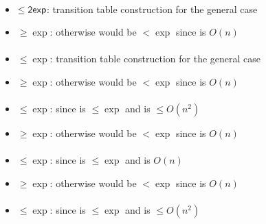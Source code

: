 \paragraph{\OLA{}\tto\ODFA}
\begin{itemize}
	\item $\le\mathsf{2exp}$: transition table construction for the general case \cite{PigPis14}
	\item $\ge\exp$: otherwise \hyperref[cost:1DLAto1DFAu]{\ODLA{}\tto\ODFA} would be $<\exp$ since \ODLA{}\tto\OLA is $O(n)$
\end{itemize}
\paragraph{\OLA{}\tto\ONFA}\label{cost:1DLAto1NFAu}
\begin{itemize}
	\item $\le\exp$: transition table construction for the general case \cite{PigPis14}
	\item $\ge\exp$: otherwise \hyperref[cost:1DLAto1NFAu]{\OLA{}\tto\ONFA} would be $<\exp$ since \ODLA{}\tto\OLA is $O(n)$
\end{itemize}
\paragraph{\OLA{}\tto\TDFA}
\begin{itemize}
	\item $\le\exp$: since \hyperref[cost:1LAto1NFAu]{\ODLA{}\tto\ONFA} is $\le\exp$ and \hyperref[cost:1NFAto2DFAu]{\ONFA{}\tto\TDFA} is $\le O(n^2)$
	\item $\ge\exp$: otherwise \hyperref[cost:1DLAto2DFAu]{\ODLA{}\tto\TDFA} would be $<\exp$ since \ODLA{}\tto\OLA is $O(n)$
\end{itemize}
\paragraph{\OLA{}\tto\TNFA}
\begin{itemize}
	\item $\le\exp$: since \hyperref[cost:1LAto1NFAu]{\ODLA{}\tto\ONFA} is $\le\exp$ and \ONFA{}\tto\TNFA is $O(n)$
	\item $\ge\exp$: otherwise \hyperref[cost:1DLAto2DFAu]{\ODLA{}\tto\TDFA} would be $<\exp$ since \ODLA{}\tto\OLA is $O(n)$
\end{itemize}
\paragraph{\OLA{}\tto\ODLA}
\begin{itemize}
	\item $\le\exp$: since \hyperref[cost:1LAto1NFAu]{\ODLA{}\tto\ONFA} is $\le\exp$ and \hyperref[cost:1NFAto1DLAu]{\ONFA{}\tto\ODLA} is $\le O(n^2)$
\end{itemize}


